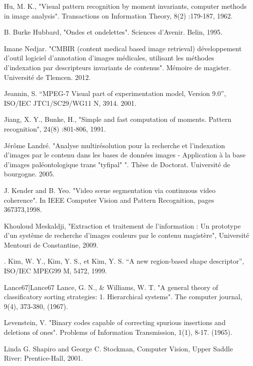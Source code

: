 \documentclass[
openany,
11pt, %
french, %
singlespacing, %
headsepline, %
]{MastersDoctoralThesis} %
\begin{document}
\begin{thebibliography}{widest entry}
	 Hu, M. K., "Visual pattern recognition by moment invariants, computer methods in image analysis". Transactions on Information Theory, 8(2) :179-187, 1962.
	
	 B. Burke Hubbard, "Ondes et ondelettes". Sciences d'Avenir. Belin, 1995.
	
	
	 Imane Nedjar. "CMBIR (content medical based image retrieval)
	développement d’outil logiciel d’annotation d’images médicales, utilisant les
	méthodes d’indexation par descripteurs invariants de contenus". Mémoire de
	magister. Université de Tlemcen. 2012.
	
	  Jeannin, S. “MPEG-7 Visual part of experimentation model, Version 9.0”, ISO/IEC JTC1/SC29/WG11 N, 3914. 2001.
	
	  Jiang, X. Y.,  Bunke, H., "Simple and fast computation of moments. Pattern recognition", 24(8) :801-806, 1991.
	
	 Jérôme Landré. "Analyse multirésolution pour la recherche et
	l’indexation d’images par le contenu dans les bases de données images -
	Application à la base d’images paléontologique trans "tyfipal" ". Thèse de
	Doctorat. Université de bourgogne. 2005.
	
	
	 J. Kender and B. Yeo. "Video scene segmentation via continuous video coherence". In IEEE Computer Vision and Pattern Recognition, pages 367373,1998.
	
	
	 Khouloud Meskaldji, "Extraction et traitement de l’information : Un prototype d’un système de recherche d’images couleurs par le contenu magistère", Université Mentouri de Constantine, 2009.
	
	. Kim, W. Y., Kim, Y. S., et Kim, Y. S. “A new region-based shape descriptor”, ISO/IEC MPEG99 M, 5472, 1999.
	
	\bibitem Lance67]{Lance67} Lance, G. N., \& Williams, W. T. "A general theory of classificatory sorting strategies: 1. Hierarchical systems". The computer journal, 9(4), 373-380, (1967).
	
	 Levenstein, V. "Binary codes capable of correcting spurious insertions and deletions of ones". Problems of Information Transmission, 1(1), 8-17. (1965).
	
	 Linda G. Shapiro and George C. Stockman, Computer Vision, Upper Saddle River: Prentice-Hall, 2001.
	

\end{thebibliography}
\end{document}
